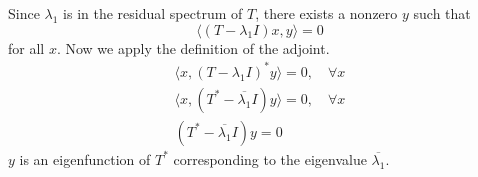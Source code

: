 \begin{Solution}
  Since $\lambda_1$ is in the residual spectrum of $T$, there exists a nonzero
  $y$ such that
  \[
  \langle (T - \lambda_1 I) x, y \rangle = 0
  \]
  for all $x$.  Now we apply the definition of the adjoint.
  \begin{gather*}
    \langle x, (T - \lambda_1 I)^* y \rangle = 0, \quad \forall x \\
    \langle x, (T^* - \overline{\lambda_1} I) y \rangle = 0, \quad \forall x \\
    (T^* - \overline{\lambda_1} I) y = 0
  \end{gather*}
  $y$ is an eigenfunction of $T^*$ corresponding to the eigenvalue 
  $\overline{\lambda_1}$.
\end{Solution}



